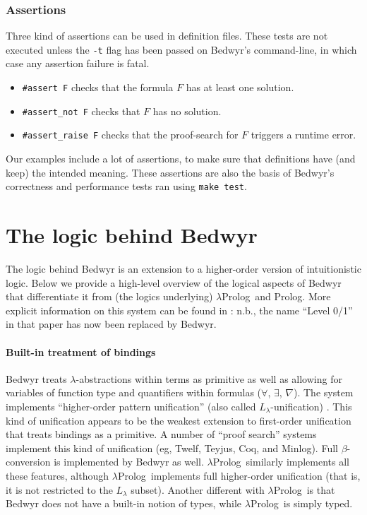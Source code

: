 \documentclass{article}
\newcommand{\lp}{$\lambda$Prolog}
\begin{document}
\subsubsection{Assertions}

Three kind of assertions can be used in definition files.
These tests are not executed unless the \verb.-t. flag has been passed 
on Bedwyr's command-line, in which case any assertion failure is fatal.
\begin{itemize}
\item
\verb.#assert F. checks that the formula $F$ has at least one solution.
\item
\verb.#assert_not F. checks that $F$ has no solution.
\item
\verb.#assert_raise F. checks that the proof-search for $F$ triggers
a runtime error.
\end{itemize}

Our examples include a lot of assertions, to make sure that definitions have 
(and keep) the intended meaning. These assertions are also the basis of
Bedwyr's correctness and performance tests ran using \verb.make test..

\section{The logic behind Bedwyr}
\label{logic}

The logic behind Bedwyr is an extension to a higher-order version of
intuitionistic logic.  Below we provide a high-level overview of the
logical aspects of Bedwyr that differentiate it from (the logics
underlying) \lp\ and Prolog.  More explicit information on this system
can be found in \cite{tiu05eshol}: n.b., the name ``Level 0/1'' in
that paper has now been replaced by Bedwyr.


\paragraph{Built-in treatment of bindings}
Bedwyr treats $\lambda$-abstractions within terms as primitive as well
as allowing for variables of function type and quantifiers within
formulas ($\forall$, $\exists$, $\nabla$).  The system
implements ``higher-order pattern unification'' (also called
$L_\lambda$-unification) \cite{miller91jlc}.   This kind of unification
appears to be the weakest extension to first-order unification that
treats bindings as a primitive.  A number of ``proof search'' systems
implement this kind of unification (eg, Twelf, Teyjus, Coq, and
Minlog).  Full $\beta$-conversion is implemented by Bedwyr as well.
\lp\ similarly implements all these features, although \lp\ implements
full higher-order unification (that is, it is not restricted to the
$L_\lambda$ subset).  Another different with \lp\ is that Bedwyr does
not have a built-in notion of types, while \lp\ is simply typed.
\end{document}
